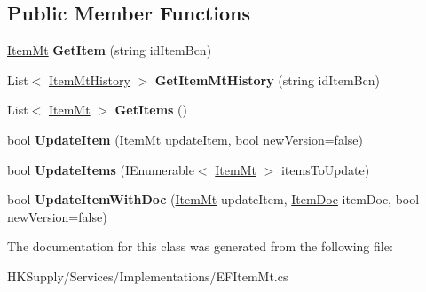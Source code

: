 \subsection*{Public Member Functions}
\begin{DoxyCompactItemize}
\item 
\mbox{\label{class_h_k_supply_1_1_services_1_1_implementations_1_1_e_f_item_mt_a50ab0372f6058558efcbe01834b7b9aa}} 
\mbox{\hyperlink{class_h_k_supply_1_1_models_1_1_item_mt}{Item\+Mt}} {\bfseries Get\+Item} (string id\+Item\+Bcn)
\item 
\mbox{\label{class_h_k_supply_1_1_services_1_1_implementations_1_1_e_f_item_mt_a8c040841ecc79d54d921d31cac320151}} 
List$<$ \mbox{\hyperlink{class_h_k_supply_1_1_models_1_1_item_mt_history}{Item\+Mt\+History}} $>$ {\bfseries Get\+Item\+Mt\+History} (string id\+Item\+Bcn)
\item 
\mbox{\label{class_h_k_supply_1_1_services_1_1_implementations_1_1_e_f_item_mt_a3b508835014d45deee184bf303e62517}} 
List$<$ \mbox{\hyperlink{class_h_k_supply_1_1_models_1_1_item_mt}{Item\+Mt}} $>$ {\bfseries Get\+Items} ()
\item 
\mbox{\label{class_h_k_supply_1_1_services_1_1_implementations_1_1_e_f_item_mt_a4691e7c3962b4ff4635fe54548faba63}} 
bool {\bfseries Update\+Item} (\mbox{\hyperlink{class_h_k_supply_1_1_models_1_1_item_mt}{Item\+Mt}} update\+Item, bool new\+Version=false)
\item 
\mbox{\label{class_h_k_supply_1_1_services_1_1_implementations_1_1_e_f_item_mt_a00b0677cb45c8f9748cfba4d5f4d4cc7}} 
bool {\bfseries Update\+Items} (I\+Enumerable$<$ \mbox{\hyperlink{class_h_k_supply_1_1_models_1_1_item_mt}{Item\+Mt}} $>$ items\+To\+Update)
\item 
\mbox{\label{class_h_k_supply_1_1_services_1_1_implementations_1_1_e_f_item_mt_ab042591a94364b87d1952e6ea508a9dc}} 
bool {\bfseries Update\+Item\+With\+Doc} (\mbox{\hyperlink{class_h_k_supply_1_1_models_1_1_item_mt}{Item\+Mt}} update\+Item, \mbox{\hyperlink{class_h_k_supply_1_1_models_1_1_item_doc}{Item\+Doc}} item\+Doc, bool new\+Version=false)
\end{DoxyCompactItemize}


The documentation for this class was generated from the following file\+:\begin{DoxyCompactItemize}
\item 
H\+K\+Supply/\+Services/\+Implementations/E\+F\+Item\+Mt.\+cs\end{DoxyCompactItemize}

